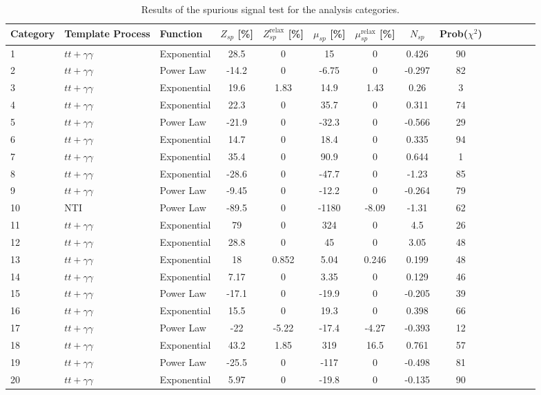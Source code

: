 \begin{table}[ht]
  \centering
  \begin{tabular}{l l l c c c c c c c c c c c}
    \hline
    Category & Template Process & Function & $Z_{sp}$ [\%] &  $Z_{sp}^\text{relax}$ [\%] & $\mu_{sp}$ [\%] & $\mu_{sp}^\text{relax}$ [\%] & $N_{sp}$ & Prob($\chi^2$)\\ \hline
1 & $tt+\gamma\gamma$ & Exponential & 28.5 & 0 & 15 & 0 & 0.426 & 90\\
2 & $tt+\gamma\gamma$ & Power Law & -14.2 & 0 & -6.75 & 0 & -0.297 & 82\\
3 & $tt+\gamma\gamma$ & Exponential & 19.6 & 1.83 & 14.9 & 1.43 & 0.26 & 3\\
4 & $tt+\gamma\gamma$ & Exponential & 22.3 & 0 & 35.7 & 0 & 0.311 & 74\\
5 & $tt+\gamma\gamma$ & Power Law & -21.9 & 0 & -32.3 & 0 & -0.566 & 29\\
6 & $tt+\gamma\gamma$ & Exponential & 14.7 & 0 & 18.4 & 0 & 0.335 & 94\\
7 & $tt+\gamma\gamma$ & Exponential & 35.4 & 0 & 90.9 & 0 & 0.644 & 1\\
8 & $tt+\gamma\gamma$ & Exponential & -28.6 & 0 & -47.7 & 0 & -1.23 & 85\\
9 & $tt+\gamma\gamma$ & Power Law & -9.45 & 0 & -12.2 & 0 & -0.264 & 79\\
10 & NTI & Power Law & -89.5 & 0 & -1180 & -8.09 & -1.31 & 62\\
11 & $tt+\gamma\gamma$ & Exponential & 79 & 0 & 324 & 0 & 4.5 & 26\\
12 & $tt+\gamma\gamma$ & Exponential & 28.8 & 0 & 45 & 0 & 3.05 & 48\\ \hline
13 & $tt+\gamma\gamma$ & Exponential & 18 & 0.852 & 5.04 & 0.246 & 0.199 & 48\\
14 & $tt+\gamma\gamma$ & Exponential & 7.17 & 0 & 3.35 & 0 & 0.129 & 46\\
15 & $tt+\gamma\gamma$ & Power Law & -17.1 & 0 & -19.9 & 0 & -0.205 & 39\\
16 & $tt+\gamma\gamma$ & Exponential & 15.5 & 0 & 19.3 & 0 & 0.398 & 66\\
17 & $tt+\gamma\gamma$ & Power Law & -22 & -5.22 & -17.4 & -4.27 & -0.393 & 12\\
18 & $tt+\gamma\gamma$ & Exponential & 43.2 & 1.85 & 319 & 16.5 & 0.761 & 57\\
19 & $tt+\gamma\gamma$ & Power Law & -25.5 & 0 & -117 & 0 & -0.498 & 81\\
20 & $tt+\gamma\gamma$ & Exponential & 5.97 & 0 & -19.8 & 0 & -0.135 & 90\\ \hline
    \hline
  \end{tabular}
  \caption{Results of the spurious signal test for the analysis categories.}
  \label{tab:spuriousSignal_1}
\end{table}

